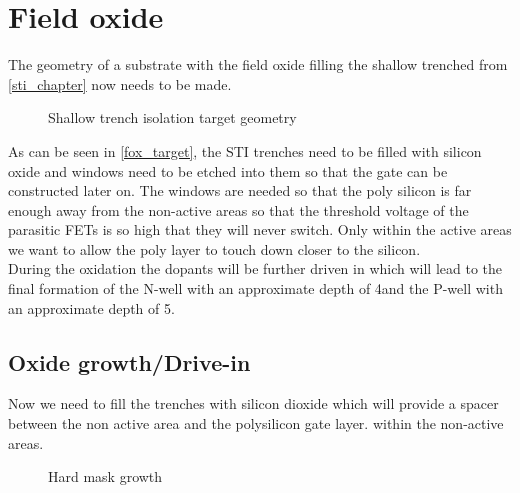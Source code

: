 \section{Field oxide}\label{fox_chapter}

The geometry of a substrate with the field oxide filling the shallow trenched from \autoref{sti_chapter} now needs to be made.

\begin{figure}[H]
	\centering
	\begin{tikzpicture}[node distance = 3cm, auto, thick,scale=\CrossAndTopSectionBig, every node/.style={transform shape}]
		
	\end{tikzpicture}
	\begin{tikzpicture}[node distance = 3cm, auto, thick,scale=\CrossAndTopSectionBig, every node/.style={transform shape}]
		
	\end{tikzpicture}
	\caption{Shallow trench isolation target geometry}
	\label{fox_target}
\end{figure}

As can be seen in \autoref{fox_target}, the STI trenches need to be filled with silicon oxide and windows need to be etched into them so that the gate can be constructed later on.
The windows are needed so that the poly silicon is far enough away from the non-active areas so that the threshold voltage of the parasitic FETs is so high that they will never switch.
Only within the active areas we want to allow the poly layer to touch down closer to the silicon. \\
During the oxidation the dopants will be further driven in which will lead to the final formation of the N-well with an approximate depth of 4\um and the P-well with an approximate depth of 5\um.

\newpage

\subsection{Oxide growth/Drive-in}
Now we need to fill the trenches with silicon dioxide which will provide a spacer between the non active area and the polysilicon gate layer. within the non-active areas.

\begin{figure}[H]
	\centering
	\begin{tikzpicture}[node distance = 3cm, auto, thick,scale=\CrossSectionOnly, every node/.style={transform shape}]
		
	\end{tikzpicture}
	\drawStepArrow{}
	\begin{tikzpicture}[node distance = 3cm, auto, thick,scale=\CrossSectionOnly, every node/.style={transform shape}]
		
	\end{tikzpicture}
	\caption{Hard mask growth}
\end{figure}

